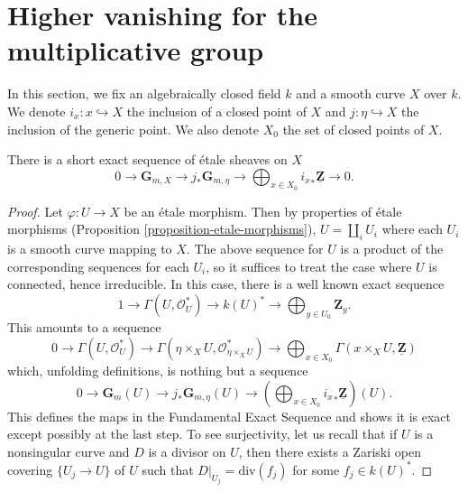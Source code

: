 \section{Higher vanishing for the multiplicative group}
\label{section-higher-Gm}

\noindent
In this section, we fix an algebraically closed field $k$ and a smooth curve
$X$ over $k$. We denote $i_x : x \hookrightarrow X$ the inclusion of a closed
point of $X$ and $j : \eta \hookrightarrow X$ the inclusion of the generic
point. We also denote $X_0$ the set of closed points of $X$.

\begin{theorem}
\label{theorem-fundamental-exact-sequence}
There is a short exact sequence of \'etale sheaves on $X$
$$
0 \longrightarrow
\mathbf{G}_{m, X} \longrightarrow
j_* \mathbf{G}_{m, \eta} \longrightarrow
\bigoplus\nolimits_{x \in X_0} {i_x}_* \underline{\mathbf{Z}}
\longrightarrow 0.
$$
\end{theorem}

\begin{proof}
Let $\varphi : U \to X$ be an \'etale morphism. Then by properties of
\'etale morphisms (Proposition \ref{proposition-etale-morphisms}),
$U = \coprod_i U_i$ where each $U_i$ is a smooth curve mapping to $X$.
The above sequence for $U$ is a product of the corresponding sequences
for each $U_i$, so it suffices to treat the case where $U$ is connected,
hence irreducible. In this case, there is a well known exact sequence
$$
1 \longrightarrow
\Gamma(U, \mathcal{O}_U^*) \longrightarrow
k(U)^* \longrightarrow \bigoplus\nolimits_{y \in U_0} \mathbf{Z}_y.
$$
This amounts to a sequence
$$
0 \longrightarrow \Gamma(U, \mathcal{O}_U^*) \longrightarrow
\Gamma(\eta \times_X U, \mathcal{O}_{\eta \times_X U}^*) \longrightarrow
\bigoplus\nolimits_{x \in X_0}
\Gamma(x \times_X U, \underline{\mathbf{Z}})
$$
which, unfolding definitions, is nothing but a sequence
$$
0 \longrightarrow \mathbf{G}_m(U) \longrightarrow
j_* \mathbf{G}_{m, \eta}(U) \longrightarrow
\left(\bigoplus\nolimits_{x \in X_0} {i_x}_* \underline{\mathbf{Z}}\right)(U).
$$
This defines the maps in the Fundamental Exact Sequence and shows it is exact
except possibly at the last step. To see surjectivity, let us recall that if
$U$ is a nonsingular curve and $D$ is a divisor on $U$,
then there exists a Zariski open covering $\{U_j \to U\}$ of $U$
such that $D|_{U_j} = \text{div}(f_j)$ for some $f_j \in k(U)^*$.
\end{proof}

